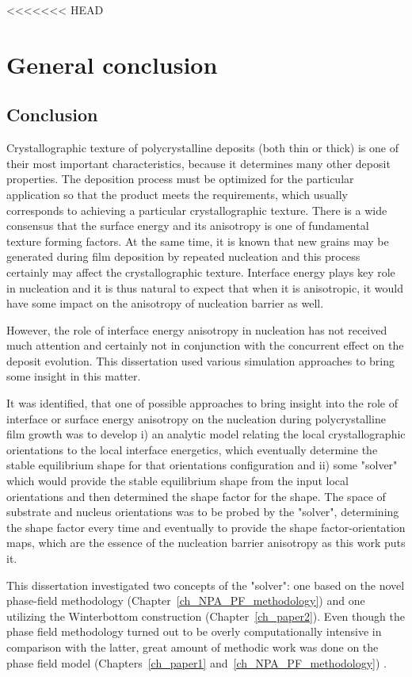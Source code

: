 <<<<<<< HEAD
\chapter{General conclusion} \label{ch_conclusion}
\section{Conclusion}
Crystallographic texture of polycrystalline deposits (both thin or thick) is one of their most important characteristics, because it determines many other deposit properties. The deposition process must be optimized for the particular application so that the product meets the requirements, which usually corresponds to achieving a particular crystallographic texture. There is a wide consensus that the surface energy and its anisotropy is one of fundamental texture forming factors. At the same time, it is known that new grains may be generated during film deposition by repeated nucleation and this process certainly may affect the crystallographic texture. Interface energy plays key role in nucleation and it is thus natural to expect that when it is anisotropic, it would have some impact on the anisotropy of nucleation barrier as well. 

However, the role of interface energy anisotropy in nucleation has not received much attention and certainly not in conjunction with the concurrent effect on the deposit evolution. This dissertation used various simulation approaches to bring some insight in this matter.

It was identified, that one of possible approaches to bring insight into the role of interface or surface energy anisotropy on the nucleation during polycrystalline film growth was to develop i) an analytic model relating the local crystallographic orientations to the local interface energetics, which eventually determine the stable equilibrium shape for that orientations configuration and ii) some "solver" which would provide the stable equilibrium shape from the input local orientations and then determined the shape factor for the shape. The space of substrate and nucleus orientations was to be probed by the "solver", determining the shape factor every time and eventually to provide the shape factor-orientation maps, which are the essence of the nucleation barrier anisotropy as this work puts it.

This dissertation investigated two concepts of the "solver": one based on the novel phase-field methodology (Chapter~\ref{ch_NPA_PF_methodology}) and one utilizing the Winterbottom construction (Chapter~\ref{ch_paper2}). Even though the phase field methodology turned out to be overly computationally intensive in comparison with the latter, great amount of methodic work was done on the phase field model (Chapters~\ref{ch_paper1} and~\ref{ch_NPA_PF_methodology}) . 

